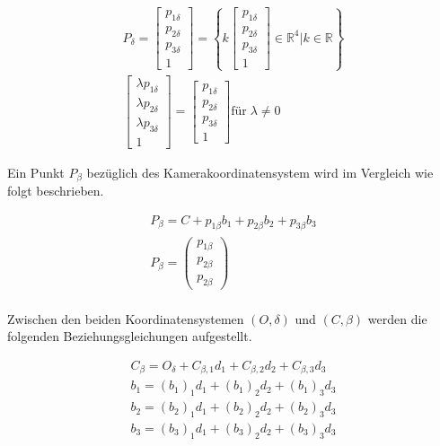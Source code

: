 	\begin{gather}
	P_\delta = \begin{bmatrix} p_{1\delta} \\ p_{2\delta} \\ p_{3\delta} \\1 \end{bmatrix} = \left\{ k \begin{bmatrix} p_{1\delta}\\p_{2\delta}\\p_{3\delta}\\1 \end{bmatrix} \in \mathbb{R} ^4 |  k \in \mathbb{R}\right\}\\
	\begin{bmatrix}\lambda p_{1\delta}\\ \lambda p_{2\delta} \\ \lambda p_{3\delta} \\ 1 \end{bmatrix} = \begin{bmatrix}p_{1\delta} \\ p_{2\delta} \\ p_{3\delta} \\ 1\end{bmatrix} \text{für} \; \lambda \ne 0
	\end{gather}

	
	Ein Punkt $P_\beta$ bezüglich des Kamerakoordinatensystem wird im Vergleich wie folgt beschrieben.
	
	\begin{gather}
	P_\beta = C + p_{1\beta}b_1 + p_{2\beta}b_2 +  p_{3\beta}b_3\\
	P_\beta = \begin{pmatrix} p_{1\beta} \\  p_{2\beta} \\ p_{2\beta}\end{pmatrix}
	\end{gather}\\
	
	Zwischen den beiden Koordinatensystemen	$(O,\delta)$  und $(C,\beta)$ werden die folgenden Beziehungsgleichungen aufgestellt. 
	
	\begin{gather}
	C_\beta = O_\delta + C_{\beta,1}d_1 +C_{\beta,2}d_2 + C_{\beta,3}d_3\\
	b_1 = (b_1)_1d_1 +  (b_1)_2d_2 +  (b_1)_3d_3\\
	b_2 = (b_2)_1d_1 +  (b_2)_2d_2 +  (b_2)_3d_3\\
	b_3 = (b_3)_1d_1 +  (b_3)_2d_2 +  (b_3)_3d_3
	\end{gather}
	
